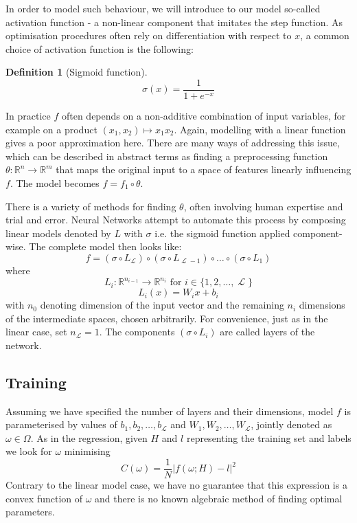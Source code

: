 \documentclass[a4paper,11pt]{article}
\theoremstyle{break}
\newtheorem{definition}{Definition}[section]
\newcommand{\R}{\mathbb{R}}
\DeclareMathOperator{\La}{\mathcal{L}}
\begin{document}
In order to model such behaviour, we will introduce to our model so-called activation function - a non-linear component  that imitates the step function. As optimisation procedures often rely on differentiation with respect to $x$, a common choice of activation function is the following:

\begin{definition}[Sigmoid function]
    $$ \sigma(x) = \frac{1}{1 + e^{-x}}$$
\end{definition}

In practice $f$ often depends on a non-additive combination of input variables, for example on a product $(x_1, x_2) \mapsto x_1 x_2$.
Again, modelling with a linear function gives a poor approximation here.
There are many ways of addressing this issue, which can be described in abstract terms as finding a preprocessing function $ \theta : \R^n \to \R^m$ that maps the original input to a space of features linearly influencing $f$. The model becomes $ f = f_1 \circ \theta $.

There is a variety of methods for finding $\theta$, often involving human expertise and trial and error.
Neural Networks attempt to automate this process by composing linear models denoted by $L$ with $\sigma$ i.e. the sigmoid function applied component-wise.
The complete model then looks like:
$$ f = (\sigma \circ L_{\La}) \circ (\sigma \circ L_{\La - 1}) \circ \ldots \circ (\sigma \circ L_{1}) $$
where
$$ L_i : \R^{n_{i-1}} \to \R^{n_{i}} \text{ for } i \in \{1, 2, \ldots, \La \} $$
$$ L_i(x) = W_i x + b_i $$
with $ n_0 $ denoting dimension of the input vector and the remaining $ n_i $ dimensions of the intermediate spaces, chosen arbitrarily. For convenience, just as in the linear case, set $ n_{\La} = 1 $. The components $ (\sigma \circ L_{i}) $ are called layers of the network.

\subsection{Training}

Assuming we have specified the number of layers and their dimensions, model $f$ is parameterised by values of $ b_1, b_2, \ldots, b_{\La} $ and $ W_1, W_2, \ldots, W_{\La} $, jointly denoted as $ \omega \in \Omega $.
As in the regression, given $H$ and $l$ representing the training set and labels we look for $ \omega $ minimising
    $$ C(\omega) =  \frac{1}{N} | f(\omega; H) - l |^2  $$
Contrary to the linear model case, we have no guarantee that this expression is a convex function of $ \omega $ and there is no known algebraic method of finding optimal parameters.
\end{document}
